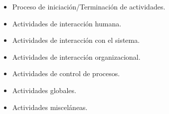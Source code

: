 		\begin{itemize}
			\item Proceso de iniciación/Terminación de actividades.
			\item Actividades de interacción humana.
			\item Actividades de interacción con el sistema. 
			\item Actividades de interacción organizacional.
			\item Actividades de control de procesos.
			\item Actividades globales.
			\item Actividades misceláneas.
		\end{itemize}
	
	